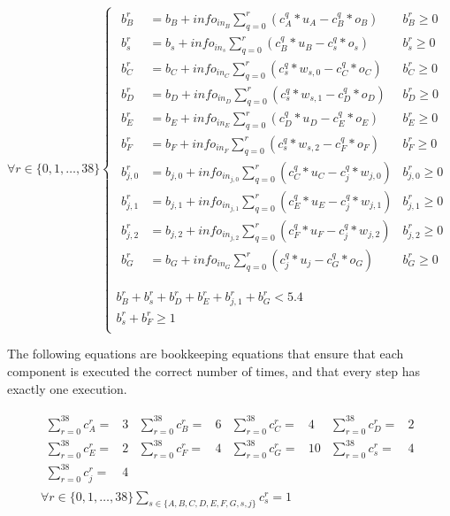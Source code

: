 \begin{displaymath}
\forall r \in \{0,1,\dots,38 \} \left\{
\begin{array}{l}
\begin{array}{rlc}
b^r_{B} & = b_{B} + info_{in_B} \sum_{q=0}^{r} (c^q_A * u_A - c^q_B * o_B) & b^r_B \ge 0 \\
b^r_{s} & = b_{s} + info_{in_s} \sum_{q=0}^{r} (c^q_B * u_B - c^q_s * o_s) & b^r_s \ge 0 \\
b^r_{C} & = b_{C} + info_{in_C} \sum_{q=0}^{r} (c^q_s * w_{s,0} - c^q_C * o_C) & b^r_C \ge 0 \\
b^r_{D} & = b_{D} + info_{in_D} \sum_{q=0}^{r} (c^q_s * w_{s,1} - c^q_D * o_D) & b^r_D \ge 0 \\
b^r_{E} & = b_{E} + info_{in_E} \sum_{q=0}^{r} (c^q_D * u_D - c^q_E * o_E) & b^r_E \ge 0 \\
b^r_{F} & = b_{F} + info_{in_F} \sum_{q=0}^{r} (c^q_s * w_{s,2} - c^q_F * o_F) & b^r_F \ge 0 \\
b^r_{j,0} & = b_{j,0} + info_{in_{j,0}} \sum_{q=0}^{r} (c^q_C * u_C - c^q_j * w_{j,0}) & b^r_{j,0} \ge 0 \\
b^r_{j,1} & = b_{j,1} + info_{in_{j,1}} \sum_{q=0}^{r} (c^q_E * u_E - c^q_j * w_{j,1}) & b^r_{j,1} \ge 0 \\
b^r_{j,2} & = b_{j,2} + info_{in_{j,2}} \sum_{q=0}^{r} (c^q_F * u_F - c^q_j * w_{j,2}) & b^r_{j,2} \ge 0 \\
b^r_{G} & = b_{G} + info_{in_G} \sum_{q=0}^{r} (c^q_j * u_j - c^q_G * o_G) & b^r_G \ge 0 \\
\end{array} \\
\\
b^r_{B} + b^r_{s} + b^r_{D} + b^r_{E} + b^r_{j, 1} + b^r_{G} < 5.4 \\
b^r_{s} + b^r_{F} \ge 1 \\
\end{array} \right.
\end{displaymath}

The following equations are bookkeeping equations that ensure that
each component is executed the correct number of times, and that
every step has exactly one execution.

\begin{displaymath}
\begin{array}{l}
\begin{array}{rlrlrlrl}
\sum_{r=0}^{38}c^r_{A} = & 3 & \sum_{r=0}^{38}c^r_{B} = & 6 &
\sum_{r=0}^{38}c^r_{C} = & 4 & \sum_{r=0}^{38}c^r_{D} = & 2 \\
\sum_{r=0}^{38}c^r_{E} = & 2 & \sum_{r=0}^{38}c^r_{F} = & 4 &
\sum_{r=0}^{38}c^r_{G} = & 10 & \sum_{r=0}^{38}c^r_{s} = & 4 \\
\sum_{r=0}^{38}c^r_{j} = & 4
\end{array}
\\
\forall r \in \{0,1,\dots,38\} \sum_{s \in \{ A, B, C, D, E, F, G,
s, j \}}c^r_{s} = 1
\end{array}
\end{displaymath}

